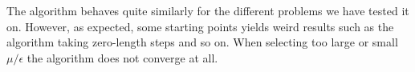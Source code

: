 The algorithm behaves quite similarly for the different problems we have tested it on. However, as expected, some starting points yields weird results such as the algorithm taking zero-length steps and so on. When selecting too large or small $\mu/\epsilon$ the algorithm does not converge at all.  
